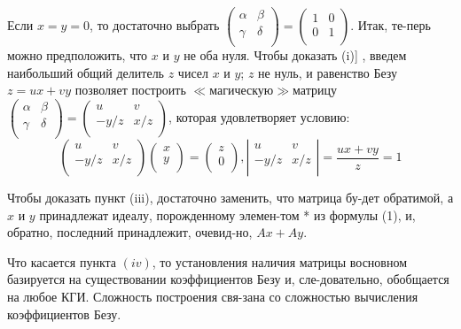 \begin{myproof}
  Если $x=y=0$, то достаточно выбрать ${\left( \begin{array}{ccc}
\alpha & \beta \\
\gamma & \delta \\
\end{array} \right)}={\left( \begin{array}{ccc}
1 & 0 \\
0 & 1 \\
\end{array} \right)}$. Итак, те-\linebreak перь можно предположить, что $x$ и $y$ не оба нуля. Чтобы доказать \linebreak (i)] , введем наибольший общий делитель $z$ чисел $x$ и $y$; $z$ не нуль, \linebreak  и равенство Безу $z=ux+vy$ позволяет построить $\ll$магическую$\gg$\linebreak матрицу ${\left( \begin{array}{ccc}
\alpha & \beta \\
\gamma & \delta \\
\end{array} \right)}={\left( \begin{array}{ccc}
u & v \\
-y/z & x/z \\
\end{array} \right)}$, которая удовлетворяет условию:
$${\left( \begin{array}{ccc}
u & v \\
-y/z & x/z \\
\end{array} \right)}{\left( \begin{array}{ccc}
x \\
y \\
\end{array} \right)}={\left( \begin{array}{ccc}
z \\
0 \\
\end{array} \right)}, {\left| \begin{array}{ccc}
u & v \\
-y/z & x/z \\
\end{array} \right|} = \frac{ux+vy}{z}=1$$
  
  Чтобы доказать пункт (iii), достаточно заменить, что матрица бу-\linebreak дет обратимой, а $x$ и $y$ принадлежат идеалу, порожденному элемен-\linebreak том * из формулы (1), и, обратно, последний принадлежит, очевид-\linebreak но, $Ax+Ay$.
 

\noindent Что касается пункта $(iv)$, то установления наличия матрицы в\linebreak основном базируется на существовании коэффициентов Безу и, сле-\linebreak довательно, обобщается на любое КГИ. Сложность построения свя-\linebreak зана со сложностью вычисления коэффициентов Безу.
\end{myproof}

